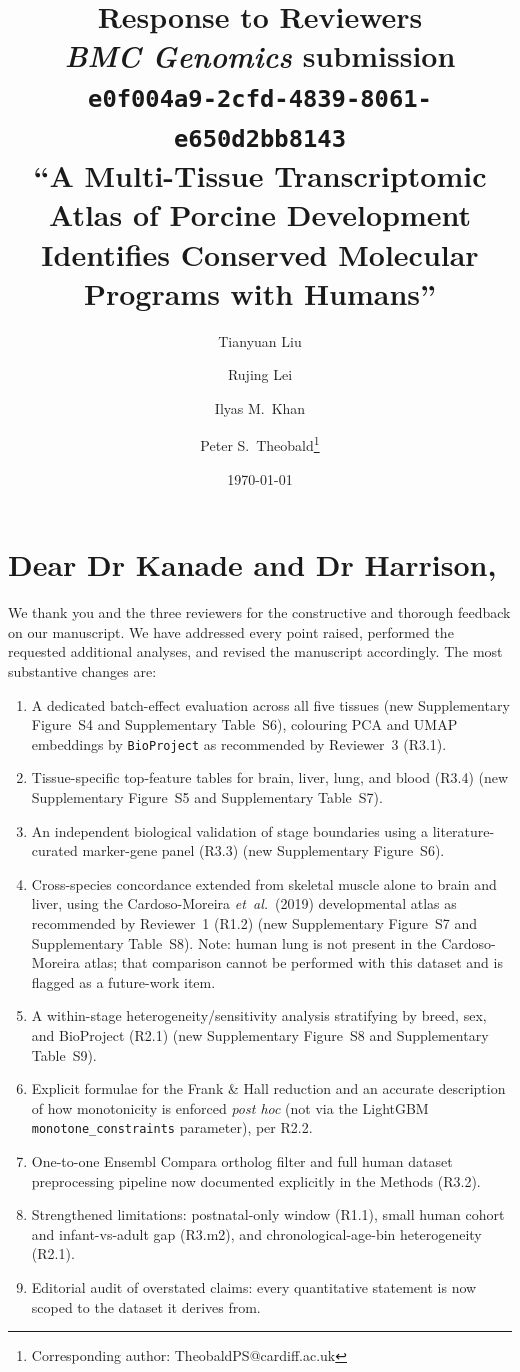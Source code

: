 \documentclass[11pt,a4paper]{article}
\title{Response to Reviewers\\
\large \emph{BMC Genomics} submission \texttt{e0f004a9-2cfd-4839-8061-e650d2bb8143}\\[4pt]
``A Multi-Tissue Transcriptomic Atlas of Porcine Development Identifies Conserved Molecular Programs with Humans''}
\author{Tianyuan Liu \and Rujing Lei \and Ilyas M.\ Khan \and Peter S.\ Theobald\thanks{Corresponding author: TheobaldPS@cardiff.ac.uk}}
\date{\today}
\begin{document}
\maketitle

\section*{Dear Dr Kanade and Dr Harrison,}

We thank you and the three reviewers for the constructive and thorough feedback
on our manuscript. We have addressed every point raised, performed the requested
additional analyses, and revised the manuscript accordingly. The most substantive
changes are:
\begin{enumerate}[leftmargin=*, itemsep=2pt, topsep=2pt]
  \item A dedicated batch-effect evaluation across all five tissues
        (new Supplementary Figure~S4 and Supplementary Table~S6), colouring
        PCA and UMAP embeddings by \texttt{BioProject} as recommended by
        Reviewer~3 (R3.1).
  \item Tissue-specific top-feature tables for brain, liver, lung, and blood
        (R3.4) (new Supplementary Figure~S5 and Supplementary Table~S7).
  \item An independent biological validation of stage boundaries using a
        literature-curated marker-gene panel (R3.3)
        (new Supplementary Figure~S6).
  \item Cross-species concordance extended from skeletal muscle alone to
        brain and liver, using the Cardoso-Moreira \emph{et~al.}\ (2019)
        developmental atlas as recommended by Reviewer~1 (R1.2)
        (new Supplementary Figure~S7 and Supplementary Table~S8). Note:
        human lung is not present in the Cardoso-Moreira atlas; that
        comparison cannot be performed with this dataset and is flagged
        as a future-work item.
  \item A within-stage heterogeneity/sensitivity analysis stratifying by
        breed, sex, and BioProject (R2.1) (new Supplementary Figure~S8 and
        Supplementary Table~S9).
  \item Explicit formulae for the Frank \& Hall reduction and an accurate
        description of how monotonicity is enforced \emph{post hoc} (not via
        the LightGBM \texttt{monotone\_constraints} parameter), per R2.2.
  \item One-to-one Ensembl Compara ortholog filter and full human dataset
        preprocessing pipeline now documented explicitly in the Methods
        (R3.2).
  \item Strengthened limitations: postnatal-only window (R1.1), small human
        cohort and infant-vs-adult gap (R3.m2), and chronological-age-bin
        heterogeneity (R2.1).
  \item Editorial audit of overstated claims: every quantitative statement is
        now scoped to the dataset it derives from.
\end{enumerate}
\end{document}
